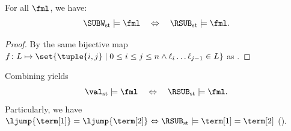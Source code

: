 \begin{proposition}\label{proposition: st SUBW and ORD}
       For all  $\fml$, we have:
       \[\SUBW_{\mathrm{st}} \models \fml \quad\Leftrightarrow\quad \RSUB_{\mathrm{st}} \models \fml.\]
\end{proposition}
\begin{proof}
By the same bijective map $f \colon L \mapsto \set{\tuple{i,j} \mid 0 \le i \le j \le n \land \ell_{i} \dots \ell_{j-1} \in L}$ as .
\end{proof}

Combining  yields
\[\val_{\mathrm{st}} \models \fml \quad\Leftrightarrow\quad \RSUB_{\mathrm{st}} \models \fml.\]
Particularly, we have $\ljump{\term[1]} = \ljump{\term[2]} \Leftrightarrow \RSUB_{\mathrm{st}} \models \term[1] = \term[2]$ ().
